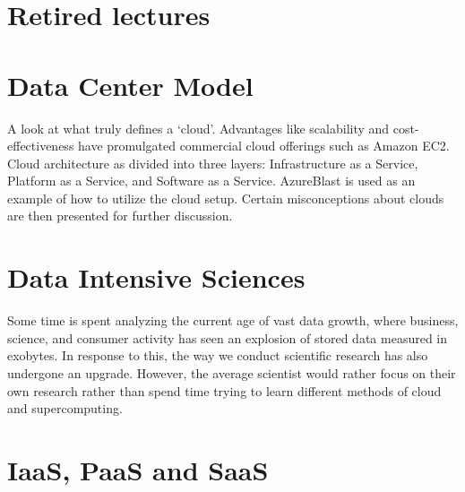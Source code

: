 \section{Retired lectures}




\section{Data Center Model}

A look at what truly defines a `cloud'. Advantages like scalability and
cost-effectiveness have promulgated commercial cloud offerings such as
Amazon EC2. Cloud architecture as divided into three layers:
Infrastructure as a Service, Platform as a Service, and Software as a
Service. AzureBlast is used as an example of how to utilize the cloud
setup. Certain misconceptions about clouds are then presented for
further discussion.



\section{Data Intensive Sciences}

Some time is spent analyzing the current age of vast data growth, where
business, science, and consumer activity has seen an explosion of stored
data measured in exobytes. In response to this, the way we conduct
scientific research has also undergone an upgrade. However, the average
scientist would rather focus on their own research rather than spend
time trying to learn different methods of cloud and supercomputing.



\section{IaaS, PaaS and SaaS}


